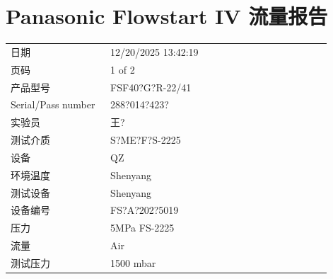 \documentclass[UTF8,10pt,a4paper,fontset=fandol]{ctexart}
\newcommand{\fieldvalue}[1]{#1}
\begin{document}
\newpage

\section{Panasonic Flowstart IV 流量报告}

\begin{tabular}{@{}p{0.28\linewidth}p{0.62\linewidth}@{}}
日期 &
\fieldvalue{12/20/2025 13:42:19} \\

页码 &
\fieldvalue{1 of 2} \\

产品型号 &
\fieldvalue{FSF40?G?R-22/41} \\

Serial/Pass number &
\fieldvalue{288?014?423?} \\

实验员 &
\fieldvalue{王?} \\

测试介质 &
\fieldvalue{S?ME?F?S-2225} \\

设备 &
\fieldvalue{QZ} \\

环境温度 &
\fieldvalue{Shenyang} \\

测试设备 &
\fieldvalue{Shenyang} \\

设备编号 &
\fieldvalue{FS?A?202?5019} \\

压力 &
\fieldvalue{5MPa FS-2225} \\

流量 &
\fieldvalue{Air} \\

测试压力 &
\fieldvalue{1500 mbar} \\


\end{tabular}
\end{document}
